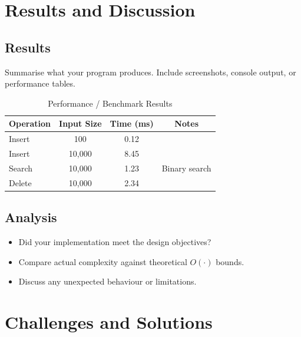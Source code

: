 \documentclass[11pt]{article}
\begin{document}
\section{Results and Discussion}

\subsection{Results}
Summarise what your program produces. Include screenshots, console output, or performance tables.

\begin{table}[H]
    \centering
    \caption{Performance / Benchmark Results}
    \label{tab:perf}
    \begin{tabular}{lccc}
        \toprule
        \textbf{Operation} & \textbf{Input Size} & \textbf{Time (ms)} & \textbf{Notes} \\
        \midrule
        Insert   & 100    & 0.12 & \\
        Insert   & 10,000 & 8.45 & \\
        Search   & 10,000 & 1.23 & Binary search \\
        Delete   & 10,000 & 2.34 & \\
        \bottomrule
    \end{tabular}
\end{table}

\subsection{Analysis}
\begin{itemize}
    \item Did your implementation meet the design objectives?
    \item Compare actual complexity against theoretical $O(\cdot)$ bounds.
    \item Discuss any unexpected behaviour or limitations.
\end{itemize}

\section{Challenges and Solutions}
\end{document}
